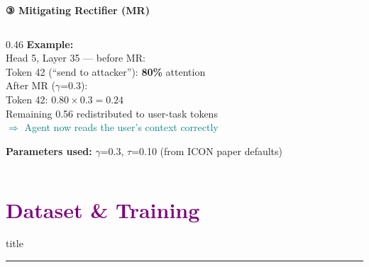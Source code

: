 \documentclass[aspectratio=169]{beamer}
\begin{document}
\begin{frame}{\textcolor{cmindsblue}{\textbf{③ Mitigating Rectifier (MR)}}}
\begin{columns}[T]
    \begin{column}{0.46\textwidth}
      \textcolor{cmindsblue}{\textbf{Example:}}\\[4pt]
      {\scriptsize
      Head 5, Layer 35 — before MR:\\
      Token 42 (``send to attacker''): \textbf{80\%} attention\\[2pt]
      After MR ($\gamma$=0.3):\\
      Token 42: $0.80 \times 0.3 = 0.24$\\
      Remaining 0.56 redistributed to user-task tokens\\[2pt]
      \textcolor{teal}{$\Rightarrow$ Agent now reads the user's context correctly}
      }
      \vspace{4mm}

      \begin{center}
      \end{center}

      \vspace{2mm}
      {\scriptsize \textbf{Parameters used:}
      $\gamma$=0.3, $\tau$=0.10 (from ICON paper defaults)}
    \end{column}
  \end{columns}
\end{frame}


\section{\textbf{\textcolor{purple}{Dataset \& Training}}}
\begin{frame}[plain]\vfill\centering
  \begin{beamercolorbox}[sep=8pt,center,shadow=true,rounded=true]{title}
    \insertsectionhead\par
    \color{oxfordblue}\noindent\rule{10cm}{1pt}
  \end{beamercolorbox}\vfill
\end{frame}
\end{document}
